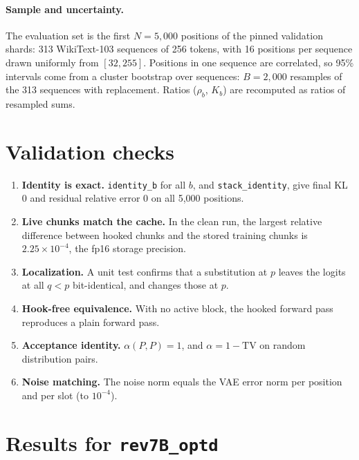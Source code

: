 \documentclass[11pt]{article}
\newcommand{\TV}{\mathrm{TV}}
\begin{document}
\paragraph{Sample and uncertainty.} The evaluation set is the first $N = 5{,}000$ positions of the pinned validation shards:
313 WikiText-103 sequences of 256 tokens, with 16 positions per sequence drawn uniformly from $[32, 255]$. Positions in one
sequence are correlated, so 95\% intervals come from a cluster bootstrap over sequences: $B = 2{,}000$ resamples of the 313
sequences with replacement. Ratios ($\rho_b$, $K_b$) are recomputed as ratios of resampled sums.

\section{Validation checks}
\label{sec:checks}

\begin{enumerate}
  \item \textbf{Identity is exact.} \texttt{identity\_b} for all $b$, and \texttt{stack\_identity}, give final KL $0$ and
    residual relative error $0$ on all 5{,}000 positions.
  \item \textbf{Live chunks match the cache.} In the clean run, the largest relative difference between hooked chunks
    and the stored training chunks is $2.25 \times 10^{-4}$, the fp16 storage precision.
  \item \textbf{Localization.} A unit test confirms that a substitution at $p$ leaves the logits at all $q < p$
    bit-identical, and changes those at $p$.
  \item \textbf{Hook-free equivalence.} With no active block, the hooked forward pass reproduces a plain forward pass.
  \item \textbf{Acceptance identity.} $\alpha(P, P) = 1$, and $\alpha = 1 - \TV$ on random distribution pairs.
  \item \textbf{Noise matching.} The noise norm equals the VAE error norm per position and per slot (to $10^{-4}$).
\end{enumerate}

\section{Results for \texttt{rev7B\_optd}}
\end{document}
